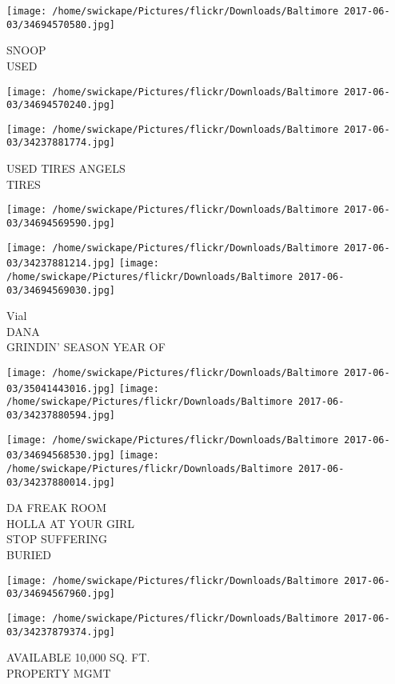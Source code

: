 \documentclass[10pt,letterpaper]{article}
\begin{document}
\vspace{0.25in}
\texttt{[image: /home/swickape/Pictures/flickr/Downloads/Baltimore 2017-06-03/34694570580.jpg]}

SNOOP\\
USED
\pagebreak

\texttt{[image: /home/swickape/Pictures/flickr/Downloads/Baltimore 2017-06-03/34694570240.jpg]}

\vspace{0.25in}
\texttt{[image: /home/swickape/Pictures/flickr/Downloads/Baltimore 2017-06-03/34237881774.jpg]}

USED TIRES ANGELS\\
TIRES
\pagebreak

\texttt{[image: /home/swickape/Pictures/flickr/Downloads/Baltimore 2017-06-03/34694569590.jpg]}

\vspace{0.25in}
\texttt{[image: /home/swickape/Pictures/flickr/Downloads/Baltimore 2017-06-03/34237881214.jpg]}
\texttt{[image: /home/swickape/Pictures/flickr/Downloads/Baltimore 2017-06-03/34694569030.jpg]}

Vial\\
DANA\\
GRINDIN' SEASON YEAR OF
\pagebreak

\texttt{[image: /home/swickape/Pictures/flickr/Downloads/Baltimore 2017-06-03/35041443016.jpg]}
\texttt{[image: /home/swickape/Pictures/flickr/Downloads/Baltimore 2017-06-03/34237880594.jpg]}

\texttt{[image: /home/swickape/Pictures/flickr/Downloads/Baltimore 2017-06-03/34694568530.jpg]}
\texttt{[image: /home/swickape/Pictures/flickr/Downloads/Baltimore 2017-06-03/34237880014.jpg]}

DA FREAK ROOM\\
HOLLA AT YOUR GIRL\\
STOP SUFFERING\\
BURIED
\pagebreak

\texttt{[image: /home/swickape/Pictures/flickr/Downloads/Baltimore 2017-06-03/34694567960.jpg]}

\vspace{0.25in}
\texttt{[image: /home/swickape/Pictures/flickr/Downloads/Baltimore 2017-06-03/34237879374.jpg]}

AVAILABLE 10,000 SQ. FT.\\
PROPERTY MGMT
\pagebreak
\end{document}
